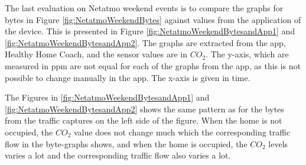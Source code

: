 The last evaluation on Netatmo weekend events is to compare the graphs for bytes in Figure \ref{fig:NetatmoWeekendBytes} against values from the application of the device. This is presented in Figure \ref{fig:NetatmoWeekendBytesandApp1} and \ref{fig:NetatmoWeekendBytesandApp2}. The graphs are extracted from the app, Healthy Home Coach, and the sensor values are in \(CO_2\). The y-axis, which are measured in ppm are not equal for each of the graphs from the app, as this is not possible to change manually in the app. The x-axis is given in time. 

The Figures in \ref{fig:NetatmoWeekendBytesandApp1} and \ref{fig:NetatmoWeekendBytesandApp2} shows the same pattern as for the bytes from the traffic captures on the left side of the figure. When the home is not occupied, the \(CO_2\) value does not change much which the corresponding traffic flow in the byte-graphs shows, and when the home is occupied, the \(CO_2\) levels varies a lot and the corresponding traffic flow also varies a lot. 

